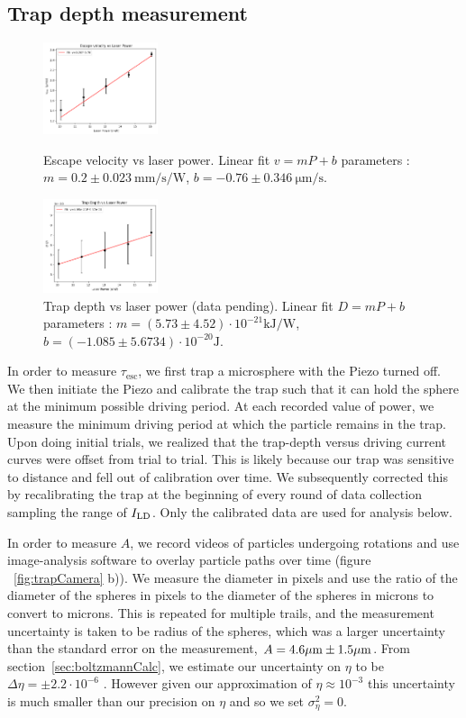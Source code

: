 \documentclass[aps,prb,twocolumn,superscriptaddress,floatfix,longbibliography,citeautoscript]{revtex4-2}
\begin{document}
\subsection{Trap depth measurement \label{sec:trapDepthMeasurement}}
\begin{figure}
    \centering
    \includegraphics[width=0.3\textwidth]{figs/vesc.png}
    \caption{Escape velocity vs laser power. Linear fit $v = mP + b$ parameters : $m = 0.2\pm \SI{0.023}{\milli\meter\per\second\per\watt}$, $b = -0.76 \pm \SI{0.346}{\micro\meter\per\second}$. }
    \label{fig:plot1}

    \includegraphics[width=0.3\textwidth]{figs/depth.png}
    \caption{Trap depth vs laser power (data pending). Linear fit $D = mP + b$ parameters : $m = (5.73 \pm 4.52 )\cdot 10^{-21} \si{\kilo\joule\per\watt}$, $b = (-1.085\pm 5.6734)\cdot 10^{-20} \si{\joule}$. }
    \label{fig:plot2}
\end{figure}
In order to measure $\tau_{\text{esc}}$, we first trap a microsphere with the Piezo turned off. We then initiate the Piezo and calibrate the trap such that it can hold the sphere at the minimum possible driving period. At each recorded value of power, we measure the minimum driving period at which the particle remains in the trap. Upon doing initial trials, we realized that the trap-depth versus driving current curves were offset from trial to trial. This is likely because our trap was sensitive to distance and fell out of calibration over time. We subsequently corrected this by recalibrating the trap at the beginning of every round of data collection sampling the range of $I_{\mathrm{LD}}$. Only the calibrated data are used for analysis below. 

In order to measure $A$, we record videos of particles undergoing rotations and use image-analysis software to overlay particle paths over time (figure ~\ref{fig:trapCamera} b)). We measure the diameter in pixels and use the ratio of the diameter of the spheres in pixels to the diameter of the spheres in microns to convert to microns. This is repeated for multiple trails, and the measurement uncertainty is taken to be radius of the spheres, which was a larger uncertainty than the standard error on the measurement, $A = 4.6\mu\mathrm{m} \pm 1.5 \mu\mathrm{m}$. From section~\ref{sec:boltzmannCalc}, we estimate our uncertainty on $\eta$ to be $\Delta\eta =  \pm 2.2 \cdot 10^{-6}$ . However given our approximation of $\eta \approx 10^{-3}$ this uncertainty is much smaller than our precision on $\eta$ and so we set $\sigma^2_\eta = 0$.
\end{document}
